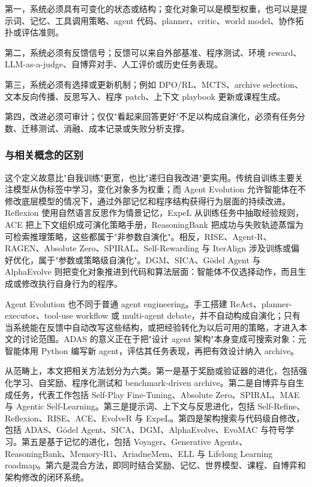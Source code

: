 第一，系统必须具有可变化的状态或结构；变化对象可以是模型权重，也可以是提示词、记忆、工具调用策略、agent 代码、planner、critic、world model、协作拓扑或评估准则。

第二，系统必须有反馈信号；反馈可以来自外部基准、程序测试、环境 reward、LLM-as-a-judge、自博弈对手、人工评价或历史任务表现。

第三，系统必须有选择或更新机制；例如 DPO/RL、MCTS、archive selection、文本反向传播、反思写入、程序 patch、上下文 playbook 更新或课程生成。

第四，改进必须可审计；仅仅"看起来回答更好"不足以构成自演化，必须有任务分数、迁移测试、消融、成本记录或失败分析支撑。

\subsubsection{与相关概念的区别}

这个定义故意比"自我训练"更宽，也比"递归自我改进"更实用。传统自训练主要关注模型从伪标签中学习，变化对象多为权重；而 Agent Evolution 允许智能体在不修改底层模型的情况下，通过外部记忆和程序结构获得行为层面的持续改进。Reflexion 使用自然语言反思作为情景记忆，ExpeL 从训练任务中抽取经验规则，ACE 把上下文组织成可演化策略手册，ReasoningBank 把成功与失败轨迹蒸馏为可检索推理策略，这些都属于"非参数自演化"。相反，RISE、Agent-R、RAGEN、Absolute Zero、SPIRAL、Self-Rewarding 与 IterAlign 涉及训练或偏好优化，属于"参数或策略级自演化"。DGM、SICA、Gödel Agent 与 AlphaEvolve 则把变化对象推进到代码和算法层面：智能体不仅选择动作，而且生成或修改执行自身行为的程序。

Agent Evolution 也不同于普通 agent engineering。手工搭建 ReAct、planner-executor、tool-use workflow 或 multi-agent debate，并不自动构成自演化；只有当系统能在反馈中自动改写这些结构，或把经验转化为以后可用的策略，才进入本文的讨论范围。ADAS 的意义正在于把"设计 agent 架构"本身变成可搜索对象：元智能体用 Python 编写新 agent，评估其任务表现，再把有效设计纳入 archive。

从范畴上，本文把相关方法划分为六类。第一是基于奖励或验证器的进化，包括强化学习、自奖励、程序化测试和 benchmark-driven archive。第二是自博弈与自生成任务，代表工作包括 Self-Play Fine-Tuning、Absolute Zero、SPIRAL、MAE 与 Agentic Self-Learning。第三是提示词、上下文与反思进化，包括 Self-Refine、Reflexion、RISE、ACE、EvolveR 与 ExpeL。第四是架构搜索与代码级自修改，包括 ADAS、Gödel Agent、SICA、DGM、AlphaEvolve、EvoMAC 与符号学习。第五是基于记忆的进化，包括 Voyager、Generative Agents、ReasoningBank、Memory-R1、AriadneMem、ELL 与 Lifelong Learning roadmap。第六是混合方法，即同时结合奖励、记忆、世界模型、课程、自博弈和架构修改的闭环系统。

